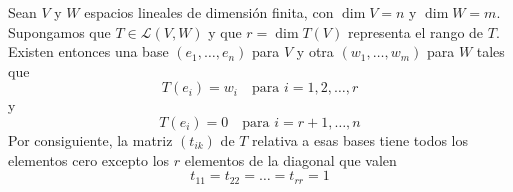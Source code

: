 \begin{theorem}
    Sean $V$ y $W$ espacios lineales de dimensión finita, con $\dim V=n$ y $\dim W=m$. Supongamos que $T\in\mathcal{L}(V,W)$ y que $r=\dim T(V)$ representa el rango de $T$. Existen entonces una base $(e_1,\dots,e_n)$ para $V$ y otra $(w_1,\dots,w_m)$ para $W$ tales que
    \begin{equation}
        T(e_i)=w_i\quad\text{para } i=1,2,\dots,r
    \end{equation}
    y
    \begin{equation}
        T(e_i)=0\quad\text{para } i=r+1,\dots,n
    \end{equation}
    Por consiguiente, la matriz $(t_{ik})$ de $T$ relativa a esas bases tiene todos los elementos cero excepto los $r$ elementos de la diagonal que valen
    $$t_{11}=t_{22}=\dots=t_{rr}=1$$

\end{theorem}
